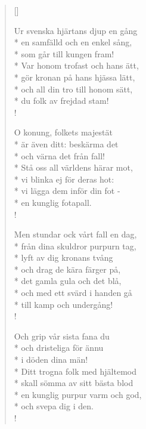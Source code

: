 
\settowidth{\versewidth}{Ur svenska hjärtans djup en gång}



\begin{verse}[\versewidth]

Ur svenska hjärtans djup en gång\\*
en samfälld och en enkel sång,\\*
som går till kungen fram!\\*
Var honom trofast och hans ätt,\\*
gör kronan på hans hjässa lätt,\\*
och all din tro till honom sätt,\\*
du folk av frejdad stam!\\!


O konung, folkets majestät\\*
är även ditt: beskärma det\\*
och värna det från fall!\\*
Stå oss all världens härar mot,\\*
vi blinka ej för deras hot:\\*
vi lägga dem inför din fot -\\*
en kunglig fotapall.\\!


Men stundar ock vårt fall en dag,\\*
från dina skuldror purpurn tag,\\*
lyft av dig kronans tvång\\*
och drag de kära färger på,\\*
det gamla gula och det blå,\\*
och med ett svärd i handen gå\\*
till kamp och undergång!\\!


Och grip vår sista fana du\\*
och dristeliga för ännu\\*
i döden dina män!\\*
Ditt trogna folk med hjältemod\\*
skall sömma av sitt bästa blod\\*
en kunglig purpur varm och god,\\*
och svepa dig i den.\\!


\end{verse}

